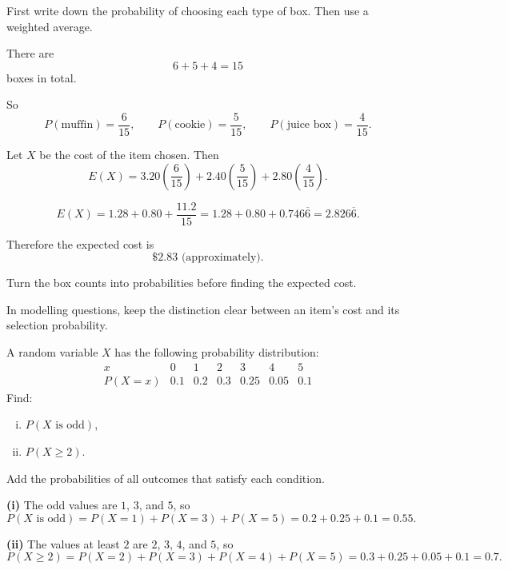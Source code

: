 \begin{hint}
First write down the probability of choosing each type of box. Then use a weighted average.
\end{hint}

\begin{solution}
There are
\[
6+5+4=15
\]
boxes in total.

So
\[
P(\text{muffin})=\frac6{15},\qquad
P(\text{cookie})=\frac5{15},\qquad
P(\text{juice box})=\frac4{15}.
\]

Let $X$ be the cost of the item chosen. Then
\[
E(X)=3.20\left(\frac6{15}\right)+2.40\left(\frac5{15}\right)+2.80\left(\frac4{15}\right).
\]

\[
E(X)=1.28+0.80+\frac{11.2}{15}=1.28+0.80+0.746\overline{6}=2.826\overline{6}.
\]

Therefore the expected cost is
\[
\$2.83 \text{ (approximately)}.
\]
\end{solution}

\begin{takeaways}
\item Turn the box counts into probabilities before finding the expected cost.
\item In modelling questions, keep the distinction clear between an item's cost and its selection probability.
\end{takeaways}

\begin{problem}
A random variable $X$ has the following probability distribution:
\[
\begin{array}{c|cccccc}
x & 0 & 1 & 2 & 3 & 4 & 5 \\
\hline
P(X=x) & 0.1 & 0.2 & 0.3 & 0.25 & 0.05 & 0.1
\end{array}
\]
Find:
\begin{enumerate}[(i)]
  \item $P(X \text{ is odd})$,
  \item $P(X\ge 2)$.
\end{enumerate}
\end{problem}

\begin{hint}
Add the probabilities of all outcomes that satisfy each condition.
\end{hint}

\begin{solution}
\textbf{(i)} The odd values are $1$, $3$, and $5$, so
\[
P(X \text{ is odd})=P(X=1)+P(X=3)+P(X=5)=0.2+0.25+0.1=0.55.
\]

\textbf{(ii)} The values at least $2$ are $2$, $3$, $4$, and $5$, so
\[
P(X\ge 2)=P(X=2)+P(X=3)+P(X=4)+P(X=5)=0.3+0.25+0.05+0.1=0.7.
\]
\end{solution}


